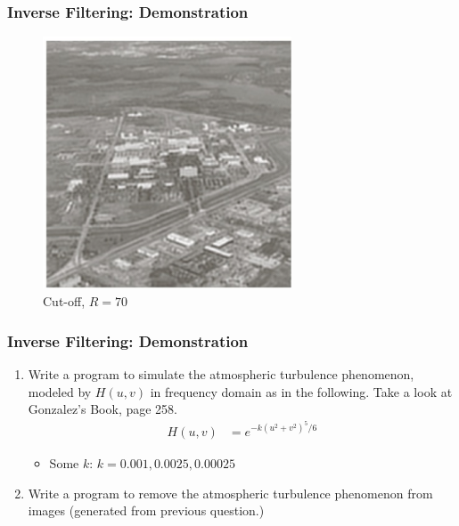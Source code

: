 \documentclass[english,11pt,table,handout]{beamer}
\begin{document}
\frame
{
	\frametitle{Inverse Filtering: Demonstration }
	\begin{figure}[!h]
		\includegraphics[height=7.5cm]{inverse_filter_off_r70.png}
		\caption{Cut-off, $R=70$}
	\end{figure}
}
\begin{frame}[fragile]
	\frametitle{Inverse Filtering: Demonstration }
	
	\begin{exercise}
		\begin{enumerate}
			\item Write a program to simulate the atmospheric turbulence phenomenon, modeled by $H(u,v)$ in frequency domain as in the following. Take a look at Gonzalez's Book, page 258.
			\begin{align}
			\nonumber
				H(u,v) &= e^{-k(u^2 + v^2)^5/6}
			\end{align}
			\begin{itemize}
				\item Some $k$: $k = 0.001, 0.0025, 0.00025$
			\end{itemize}
			
			\item Write a program to remove the atmospheric turbulence phenomenon from images (generated from previous question.)
		\end{enumerate}
	\end{exercise}
		
\end{frame}
\end{document}
